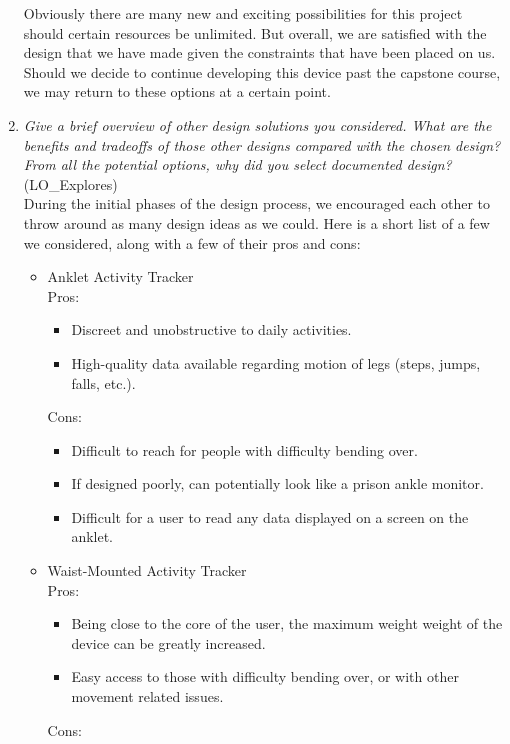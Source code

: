 \documentclass[12pt, titlepage]{article}
\begin{document}
\begin{enumerate}
Obviously there are many new and exciting possibilities for this project should certain resources be unlimited. But overall, we are satisfied with the design that we have made given the constraints that have been placed on us. Should we decide to continue developing this device past the capstone course, we may return to these options at a certain point.\\

  \item \textit{Give a brief overview of other design solutions you considered.  What
  are the benefits and tradeoffs of those other designs compared with the chosen
  design?  From all the potential options, why did you select documented design?}
  (LO\_Explores)\\

During the initial phases of the design process, we encouraged each other to throw around as many design ideas as we could. Here is a short list of a few we considered, along with a few of their pros and cons:\\
\begin{itemize}
\item Anklet Activity Tracker\\
	Pros:
	\begin{itemize}
		\item Discreet and unobstructive to daily activities.
		\item High-quality data available regarding motion of legs (steps, jumps, falls, etc.).
	\end{itemize}
	Cons:
	\begin{itemize}
		\item Difficult to reach for people with difficulty bending over.
		\item If designed poorly, can potentially look like a prison ankle monitor.
		\item Difficult for a user to read any data displayed on a screen on the anklet.
	\end{itemize}
\item Waist-Mounted Activity Tracker\\
	Pros:
	\begin{itemize}
		\item Being close to the core of the user, the maximum weight weight of the device can be greatly increased.
		\item Easy access to those with difficulty bending over, or with other movement related issues.
	\end{itemize}
	Cons:
	\begin{itemize}

\end{itemize}
\end{itemize}
\end{enumerate}
\end{document}
